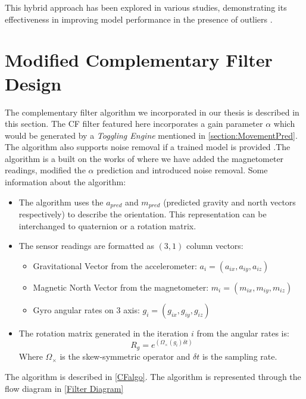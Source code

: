 \documentclass{iutbscthesis}
\begin{document}
This hybrid approach has been explored in various studies, demonstrating its effectiveness in improving model performance in the presence of outliers \cite{lopez2017ransac}.
    

\section{Modified Complementary Filter Design} \label{section:MDCF}
The complementary filter algorithm we incorporated in our thesis is described in this section. The CF filter featured here incorporates a gain parameter $\alpha$ which would be generated by a \textit{Toggling Engine} mentioned in \autoref{section:MovementPred}. The algorithm also supports noise removal if a trained model is provided \cite{denoising}.The algorithm is a built on the works of \cite{vertzberger2022adaptive} where we have added the magnetometer readings, modified the $\alpha$ prediction and introduced noise removal. Some information about the algorithm:
\begin{itemize}
    \item The algorithm uses the $a_{pred}$ and $m_{pred}$ (predicted gravity and north vectors respectively) to describe the orientation. This representation can be interchanged to quaternion or a rotation matrix\cite{black1964passive}\cite{cariow2016hardware}. 
    \item The sensor readings are formatted as $(3,1)$ column vectors:
    \begin{itemize}
        \item Gravitational Vector from the accelerometer: $a_i = (a_{ix},a_{iy},a_{iz})$
        \item Magnetic North Vector from the magnetometer: $m_i = (m_{ix},m_{iy},m_{iz})$
        \item Gyro angular rates on 3 axis: $g_i = (g_{ix},g_{iy},g_{iz})$
    \end{itemize}
    \item  The rotation matrix generated in the iteration $i$ from the angular rates \cite{zhao2016time} is:
    \begin{equation}
        R_g = e^{(\Omega_{\times}(g_i)\delta t)}
    \end{equation}
    Where $\Omega_{\times}$ is the skew-symmetric operator and $\delta t$ is the sampling rate.
\end{itemize}

The algorithm is described in \autoref{CFalgo}. The algorithm is represented through the flow diagram in \autoref{Filter Diagram} 
\end{document}
